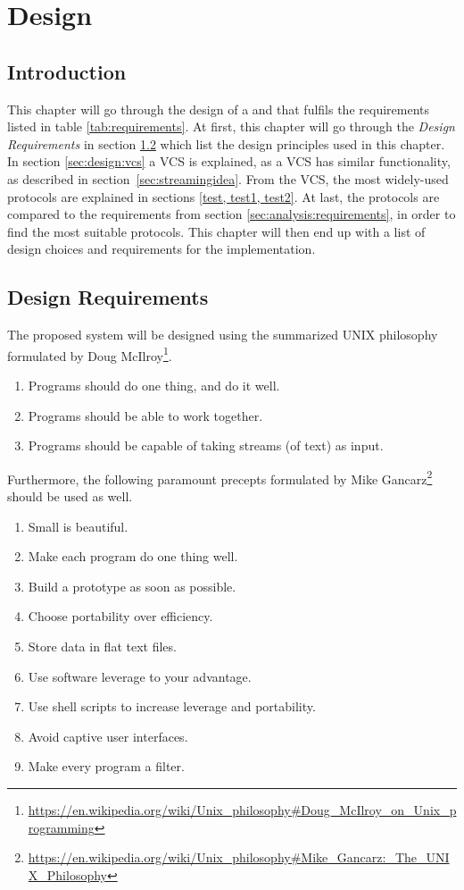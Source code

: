 \chapter{Design} \label{chp:design}

\section{Introduction}
This chapter will go through the design of a  and  that fulfils the requirements listed in table \ref{tab:requirements}.
At first, this chapter will go through the \textit{Design Requirements} in section \ref{sec:design:requirements} which list the design principles used in this chapter.
In section \ref{sec:design:vcs} a \ac{VCS} is explained, as a \ac{VCS} has similar functionality, as described in section~\ref{sec:streamingidea}.
From the \ac{VCS}, the most widely-used protocols are explained in sections \cref{test, test1, test2}.
At last, the protocols are compared to the requirements from section \ref{sec:analysis:requirements}, in order to find the most suitable protocols.
This chapter will then end up with a list of design choices and requirements for the implementation.

\section{Design Requirements} \label{sec:design:requirements}
The proposed system will be designed using the summarized UNIX philosophy formulated by Doug McIlroy\footnote{\url{https://en.wikipedia.org/wiki/Unix_philosophy\#Doug_McIlroy_on_Unix_programming}}.  
\begin{enumerate}
	\item Programs should do one thing, and do it well.
	\item Programs should be able to work together.
	\item Programs should be capable of taking streams (of text) as input.
\end{enumerate}

Furthermore, the following paramount precepts formulated by Mike Gancarz\footnote{\url{https://en.wikipedia.org/wiki/Unix_philosophy\#Mike_Gancarz:_The_UNIX_Philosophy}} should be used as well.
\begin{enumerate}
	\item Small is beautiful.
	\item Make each program do one thing well.
	\item Build a prototype as soon as possible.
	\item Choose portability over efficiency.
	\item Store data in flat text files.
	\item Use software leverage to your advantage.
	\item Use shell scripts to increase leverage and portability.
	\item Avoid captive user interfaces.
	\item Make every program a filter.
\end{enumerate}


